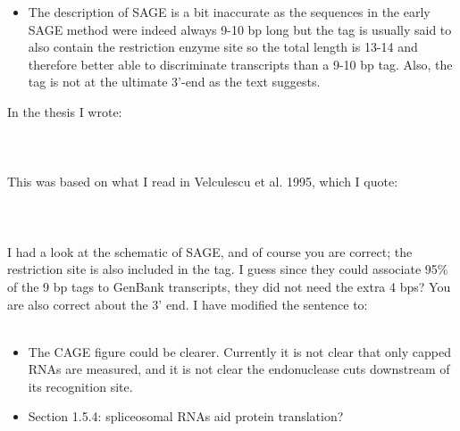 \documentclass[10pt,a4paper,sans]{article}
\begin{document}
\begin{itemize}
   \item{The description of SAGE is a bit inaccurate as the sequences in the early SAGE method were indeed always 9-10 bp long but the tag is usually said to also contain the restriction enzyme site so the total length is 13-14 and therefore better able to discriminate transcripts than a 9-10 bp tag. Also, the tag is not at the ultimate 3’-end as the text suggests.}
\end{itemize}
\noindent
In the thesis I wrote:
\\\\
\\\\
This was based on what I read in Velculescu et al. 1995, which I quote:
\\\\
\\\\
I had a look at the schematic of SAGE, and of course you are correct; the restriction site is also included in the tag. I guess since they could associate 95\% of the 9 bp tags to GenBank transcripts, they did not need the extra 4 bps? You are also correct about the 3' end. I have modified the sentence to:
\\\\

\begin{itemize}
   \item{The CAGE figure could be clearer. Currently it is not clear that only capped RNAs are measured, and it is not clear the endonuclease cuts downstream of its recognition site.}
\end{itemize}

\begin{itemize}
   \item{Section 1.5.4: spliceosomal RNAs aid protein translation?}
\end{itemize}
\end{document}
